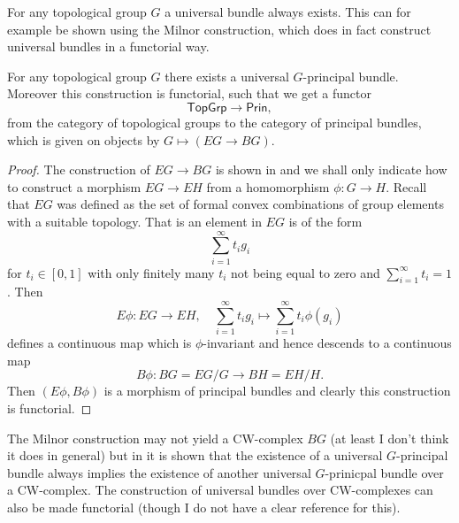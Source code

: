 For any topological group $G$ a universal bundle always exists. This can for example be shown using the Milnor construction, which does in fact construct universal bundles in a functorial way.

\begin{theorem}
    \label{fiber_bundles:thm:milnor_construction}
    For any topological group $G$ there exists a universal $G$-principal bundle. Moreover this construction is functorial, such that we get a functor 
    \[
    \mathsf{TopGrp} \to \mathsf{Prin},
    \]
    from the category of topological groups to the category of principal bundles, which is given on objects by $G \mapsto (EG \to BG)$.
\end{theorem}

\begin{proof}
    The construction of $EG \to BG$ is shown in \cite{ebert_bordism_script} and we shall only indicate how to construct a morphism $EG \to EH$ from a homomorphism $\phi \colon G \to H$. Recall that $EG$ was defined as the set of formal convex combinations of group elements with a suitable topology. That is an element in $EG$ is of the form 
    \[
    \sum_{i=1}^\infty t_i g_i
    \] 
    for $t_i \in [0,1]$ with only finitely many $t_i$ not being equal to zero and $\sum_{i=1}^\infty t_i = 1$. Then 
    \[
    E \phi \colon EG \to EH, \quad \sum_{i=1}^\infty t_i g_i \mapsto \sum_{i=1}^\infty t_i \phi(g_i)
    \]
    defines a continuous map which is $\phi$-invariant and hence descends to a continuous map $$B \phi \colon BG = EG/G \to BH = EH/H.$$
    Then $(E\phi,B\phi)$ is a morphism of principal bundles and clearly this construction is functorial.
\end{proof}

\begin{remark}
    \label{fiber_bundles:rem:base_space_as_cw_complex}
    The Milnor construction may not yield a CW-complex $BG$ (at least I don't think it does in general) but in \cite{mitchell_principalbundles} it is shown that the existence of a universal $G$-principal bundle always implies the existence of another universal $G$-prinicpal bundle over a CW-complex. The construction of universal bundles over CW-complexes can also be made functorial (though I do not have a clear reference for this).
\end{remark}

